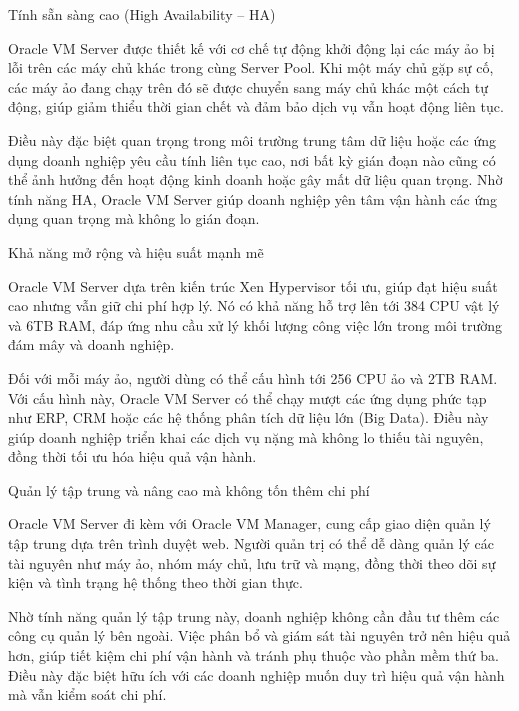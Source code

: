 \begin{myitem}

\item Tính sẵn sàng cao (High Availability – HA)

\hspace*{1cm} Oracle VM Server được thiết kế với cơ chế tự động khởi động lại các máy ảo bị lỗi trên các máy chủ khác trong cùng Server Pool. Khi một máy chủ gặp sự cố, các máy ảo đang chạy trên đó sẽ được chuyển sang máy chủ khác một cách tự động, giúp giảm thiểu thời gian chết và đảm bảo dịch vụ vẫn hoạt động liên tục.

\hspace*{1cm} Điều này đặc biệt quan trọng trong môi trường trung tâm dữ liệu hoặc các ứng dụng doanh nghiệp yêu cầu tính liên tục cao, nơi bất kỳ gián đoạn nào cũng có thể ảnh hưởng đến hoạt động kinh doanh hoặc gây mất dữ liệu quan trọng. Nhờ tính năng HA, Oracle VM Server giúp doanh nghiệp yên tâm vận hành các ứng dụng quan trọng mà không lo gián đoạn.

\item Khả năng mở rộng và hiệu suất mạnh mẽ

\hspace*{1cm} Oracle VM Server dựa trên kiến trúc Xen Hypervisor tối ưu, giúp đạt hiệu suất cao nhưng vẫn giữ chi phí hợp lý. Nó có khả năng hỗ trợ lên tới 384 CPU vật lý và 6TB RAM, đáp ứng nhu cầu xử lý khối lượng công việc lớn trong môi trường đám mây và doanh nghiệp.

\hspace*{1cm} Đối với mỗi máy ảo, người dùng có thể cấu hình tới 256 CPU ảo và 2TB RAM. Với cấu hình này, Oracle VM Server có thể chạy mượt các ứng dụng phức tạp như ERP, CRM hoặc các hệ thống phân tích dữ liệu lớn (Big Data). Điều này giúp doanh nghiệp triển khai các dịch vụ nặng mà không lo thiếu tài nguyên, đồng thời tối ưu hóa hiệu quả vận hành.

\item Quản lý tập trung và nâng cao mà không tốn thêm chi phí

\hspace*{1cm} Oracle VM Server đi kèm với Oracle VM Manager, cung cấp giao diện quản lý tập trung dựa trên trình duyệt web. Người quản trị có thể dễ dàng quản lý các tài nguyên như máy ảo, nhóm máy chủ, lưu trữ và mạng, đồng thời theo dõi sự kiện và tình trạng hệ thống theo thời gian thực.

\hspace*{1cm} Nhờ tính năng quản lý tập trung này, doanh nghiệp không cần đầu tư thêm các công cụ quản lý bên ngoài. Việc phân bổ và giám sát tài nguyên trở nên hiệu quả hơn, giúp tiết kiệm chi phí vận hành và tránh phụ thuộc vào phần mềm thứ ba. Điều này đặc biệt hữu ích với các doanh nghiệp muốn duy trì hiệu quả vận hành mà vẫn kiểm soát chi phí.


\end{myitem}
